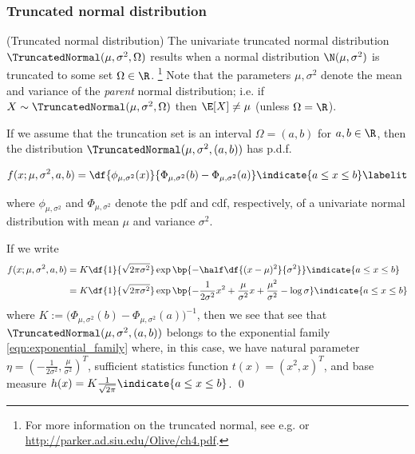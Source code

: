 \documentclass{article} %
\begin{document}




\subsubsection{Truncated normal distribution}

\begin{example}{(Truncated normal distribution)} 
\label{ex:truncated_normal_as_ef} The univariate truncated normal distribution $\TruncatedNormal(\mu,  \sigma^2,  \Omega)$ results when a normal distribution $\N(\mu,  \sigma^2)$ is truncated to some set $\Omega \in \R$. \footnote{For more information on the truncated normal,  see e.g.  \cite{burkardt2014truncated} or \url{http://parker.ad.siu.edu/Olive/ch4.pdf}.}   Note that the parameters $\mu, \sigma^2$ denote the mean and variance of the \textit{parent} normal distribution;  i.e.  if $X \sim \TruncatedNormal(\mu,  \sigma^2,  \Omega)$ then $\E[X] \neq \mu$ (unless $\Omega = \R$). 

If we assume that the truncation set is an interval $\Omega = (a,b)$ for $a,b \in \R$,  then the distribution $\TruncatedNormal(\mu,  \sigma^2,  (a,b))$ has p.d.f.

\begin{align*}
f(x ; \mu,  \sigma^2,  a,  b) = \df{\phi_{\mu, \sigma^2} (x) }{\Phi_{\mu, \sigma^2} (b)  - \Phi_{\mu, \sigma^2} (a) } \indicate{a \leq x \leq b} \labelit \label{eqn:pdf_of_normal_truncated_to_an_interval}
\end{align*} 

where $\phi_{\mu,  \sigma^2}$ and $\Phi_{\mu,  \sigma^2}$ denote the pdf and cdf,  respectively,  of a univariate normal distribution with mean $\mu$ and variance $\sigma^2$.   

If we write
\begin{align*}
f(x ; \mu,  \sigma^2,  a,  b) & = K \df{1}{\sqrt{2 \pi \sigma^2}} \exp \bp{-\half \df{(x-\mu)^2}{\sigma^2}}  \indicate{a \leq x \leq b} \\
& = K \df{1}{\sqrt{2 \pi \sigma^2}} \exp \bp{ - \frac{1}{2 \sigma^2} x^2 + \frac{\mu}{\sigma^2} x  + \frac{\mu^2}{\sigma^2}  - \log \sigma}  \indicate{a \leq x \leq b} 
\end{align*} 
where $K := \big( \Phi_{\mu, \sigma^2} (b)  - \Phi_{\mu, \sigma^2} (a) \big)^{-1}$,  then we see that see that  $\TruncatedNormal(\mu,  \sigma^2,  (a,b))$ belongs to the exponential family \eqref{eqn:exponential_family} where,  in this case,  we have natural parameter $\eta = (- \frac{1}{2 \sigma^2},  \frac{\mu}{\sigma^2})^T$,  sufficient statistics function $t(x) = (x^2,  x)^T$,  and base measure $h(x) = K \frac{1}{\sqrt{2 \pi}}  \indicate{a \leq x \leq b}$.
\qed
\end{example}
\end{document}
